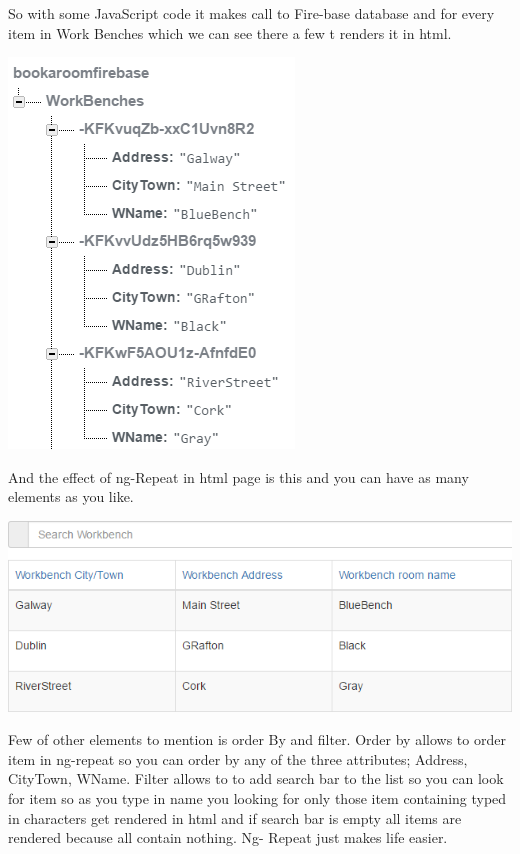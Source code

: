 \begin{itemize}
So with some JavaScript code it makes call	to Fire-base database and for every item in Work Benches which we can see there a few t renders it in html.
\bigbreak

\begin{center}    
	\includegraphics{img/FirebaseLayout.png}
\end{center}
\bigbreak

And the effect of ng-Repeat in html page is this and you can have as many elements as you like.

\begin{center}    
\includegraphics{img/PrintOutHtml.png}
\end{center}
\bigbreak

Few of other elements to mention is order By and filter. Order by allows to order item in ng-repeat so you can order by any of the three attributes; Address, CityTown, WName. Filter allows to to add search bar to the list so you can look for item so as you type in name you looking for only those item containing typed in characters get rendered in html and if search bar is empty all items are rendered because all contain nothing. Ng- Repeat just makes life easier.





\end{itemize}
